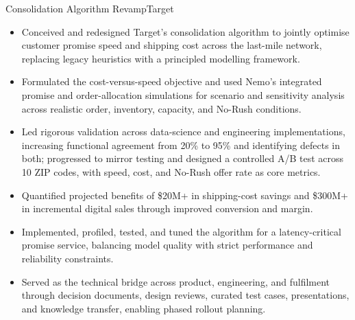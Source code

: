 \documentclass[11pt,a4paper]{moderncv}
\begin{document}
    {Consolidation Algorithm Revamp}{Target}{}{}{
    \begin{itemize}
        \item Conceived and redesigned Target's consolidation algorithm to jointly optimise customer promise speed and shipping cost across the last-mile network, replacing legacy heuristics with a principled modelling framework.
        \item Formulated the cost-versus-speed objective and used Nemo's integrated promise and order-allocation simulations for scenario and sensitivity analysis across realistic order, inventory, capacity, and No-Rush conditions.
        \item Led rigorous validation across data-science and engineering implementations, increasing functional agreement from 20\% to 95\% and identifying defects in both; progressed to mirror testing and designed a controlled A/B test across 10 ZIP codes, with speed, cost, and No-Rush offer rate as core metrics.
        \item Quantified projected benefits of \$20M+ in shipping-cost savings and \$300M+ in incremental digital sales through improved conversion and margin.
        \item Implemented, profiled, tested, and tuned the algorithm for a latency-critical promise service, balancing model quality with strict performance and reliability constraints.
        \item Served as the technical bridge across product, engineering, and fulfilment through decision documents, design reviews, curated test cases, presentations, and knowledge transfer, enabling phased rollout planning.
    \end{itemize}
    }
\end{document}
